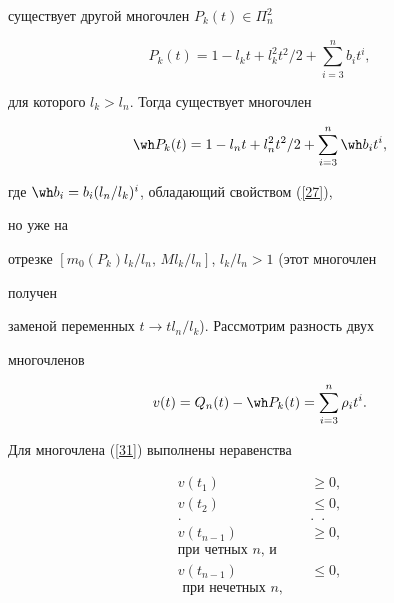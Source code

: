существует другой многочлен $P_k(t) \in \Pi^2_n$


\begin{equation}


P_k(t)=1-l_k t+l^2_k t^2 /2 +\sum_{i=3}^{n} b_i t^i,


\label{29}


\end{equation}


для которого $l_k>l_n$. Тогда существует многочлен


\begin{equation}


\wh P_k(t)=1-l_n t+l^2_n t^2/2 +\sum_{i=3}^{n} \wh b_i t^i,


\label{30}


\end{equation}


где $\wh b_i =b_i (l_n/l_k)^i$, обладающий свойством (\ref{27}),


но уже на


отрезке $[m_0(P_k)l_k/l_n,\,Ml_k/l_n]$, $l_k/l_n>1$ (этот многочлен


получен


заменой переменных $t\longrightarrow t l_n/l_k$). Рассмотрим разность двух


многочленов


\begin{equation}


v(t)=Q_n(t)-\wh P_k(t)=\sum_{i=3}^{n} \rho_i t^i.


\label{31}


\end{equation}


Для многочлена (\ref{31}) выполнены неравенства


\begin{equation}


\begin{split}


v(t_1) &\ge 0,\\


v(t_2) &\le 0,\\


. \ \; &. \ \;.\\


v(t_{n-1}) &\ge 0,\\


\text{при четных $n$, и}\quad &\ \\


v(t_{n-1}) &\le 0,\\


\text{ при нечетных $n$},\quad &\ 


\end{split}


\label{32}


\end{equation}


